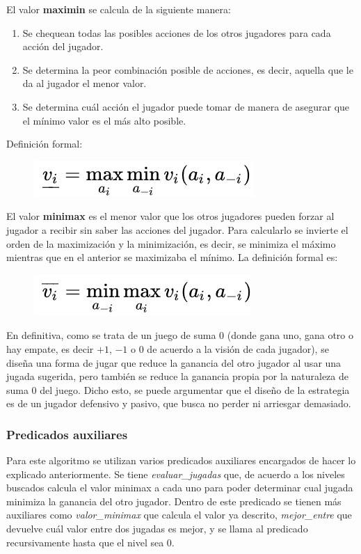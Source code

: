 \documentclass[12pt]{article} %
\begin{document}
			El valor \textbf{maximin} se calcula de la siguiente manera:
			\begin{enumerate}
				\item Se chequean todas las posibles acciones de los otros jugadores para cada acción del jugador.
				\item Se determina la peor combinación posible de acciones, es decir, aquella que le da al jugador el menor valor.
				\item Se determina cuál acción el jugador puede tomar de manera de asegurar que el mínimo valor es el más alto posible.
			\end{enumerate}
			
			Definición formal:
			\begin{figure}[h!]
				\centering
				\includegraphics[width=0.4\linewidth]{maximin}
			\end{figure}
			
			
			El valor \textbf{minimax} es el menor valor que los otros jugadores pueden forzar al jugador a recibir sin saber las acciones del jugador. Para calcularlo se invierte el orden de la maximización y la minimización, es decir, se minimiza el máximo mientras que en el anterior se maximizaba el mínimo. La definición formal es:\\
			
			\begin{figure}[h!]
				\centering
				\includegraphics[width=0.4\linewidth]{Imagenes/minimax}
			\end{figure}
			
			En definitiva, como se trata de un juego de suma 0 (donde gana uno, gana otro o hay empate, es decir $+1$, $-1$ o 0 de acuerdo a la visión de cada jugador), se diseña una forma de jugar que reduce la ganancia del otro jugador al usar una jugada sugerida, pero también se reduce la ganancia propia por la naturaleza de suma 0 del juego. Dicho esto, se puede argumentar que el diseño de la estrategia es de un jugador defensivo y pasivo, que busca no perder ni arriesgar demasiado.
		
			\subsubsection{Predicados auxiliares}
			Para este algoritmo se utilizan varios predicados auxiliares encargados de hacer lo explicado anteriormente. Se tiene \textit{evaluar\_jugadas} que, de acuerdo a los niveles buscados calcula el valor minimax a cada uno para poder determinar cual jugada minimiza la ganancia del otro jugador. Dentro de este predicado se tienen más auxiliares como \textit{valor\_minimax} que calcula el valor ya descrito, \textit{mejor\_entre} que devuelve cuál valor entre dos jugadas es mejor, y se llama al predicado recursivamente hasta que el nivel sea 0.
		
\end{document}
